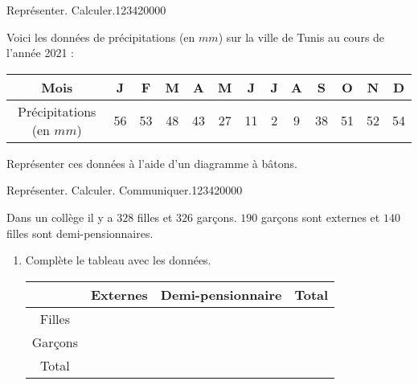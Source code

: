 \begin{pageParcoursd} 


\begin{ExoCd}{Représenter. Calculer.}{1234}{2}{0}{0}{0}{0}

 Voici les données de précipitations (en $mm$) sur la ville de Tunis au cours de l'année 2021 : 
\begin{center}
\begin{tabular}{|c|c|c|c|c|c|c|c|c|c|c|c|c|}\hline
Mois & J & F & M & A & M & J & J & A & S & O & N & D \\\hline
Précipitations (en $mm$) & 56 & 53 & 48 & 43 & 27 & 11 & 2 & 9 & 38 & 51 & 52 & 54 \\\hline
\end{tabular}
 \end{center}

Représenter ces données à l'aide d'un diagramme à bâtons.
 
\begin{center}
\end{center}
 
\end{ExoCd}

\begin{ExoCd}{Représenter. Calculer. Communiquer.}{1234}{2}{0}{0}{0}{0}
 
Dans un collège il y a $328$ filles et $326$ garçons. $190$ garçons sont externes et $140$ filles sont demi-pensionnaires.

\begin{enumerate}[leftmargin=*]
 \item Complète le tableau avec les données.
 \begin{center}
 \begin{tabular}{|c|c|c|c|} \hline
    & Externes & Demi-pensionnaire &  Total \\  \hline
  Filles &    &   & \\\hline
  Garçons &  &   &  \\\hline
  Total & &  & \\ \hline
 \end{tabular}
 \end{center}
 

\end{enumerate}
\end{ExoCd}
\end{pageParcoursd}
